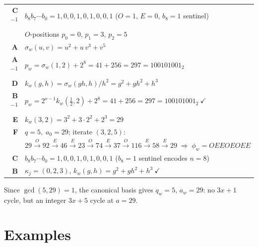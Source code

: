 \documentclass[12pt]{article}
\theoremstyle{definition}
\theoremstyle{remark}
\newcommand{\kpoly}{k}
\begin{document}
\noindent\begin{tabular}{@{}r@{\quad}l@{}}
\textbf{C\textsuperscript{$-1$}} & $b_8 b_7\cdots b_0 = 1,0,0,1,0,1,0,0,1$ \quad ($O{=}1$, $E{=}0$, $b_8{=}1$ sentinel) \\
               & $O$-positions $p_0{=}0,\,p_1{=}3,\,p_2{=}5$ \\[4pt]
\textbf{A}     & $\sigma_w(u,v) = u^2 + u\,v^3 + v^5$ \\
\textbf{A\textsuperscript{$-1$}} & $p_w = \sigma_w(1,2)+2^8 = 41+256 = 297 = 100101001_2$ \\[4pt]
\textbf{D}     & $\kpoly_w(g,h) = \sigma_w(gh,h)/h^2 = g^2+gh^2+h^3$ \\
\textbf{B\textsuperscript{$-1$}} & $p_w = 2^{o-1}\kpoly_w\!\left(\tfrac{1}{2},2\right)+2^8 = 41+256 = 297 = 100101001_2\ \checkmark$ \\[4pt]
\textbf{E}     & $\kpoly_w(3,2) = 3^2+3\cdot 2^2+2^3 = 29$ \\[4pt]
\textbf{F}     & $q=5,\;a_0=29$; iterate $(3,2,5)$: \\
               & $29\xrightarrow{O}92\xrightarrow{E}46\xrightarrow{E}23\xrightarrow{O}
                 74\xrightarrow{E}37\xrightarrow{O}116\xrightarrow{E}58\xrightarrow{E}29
                 \;\Rightarrow\;\phi_w = OEEOEOEE$ \\[4pt]
\textbf{C}     & $b_8 b_7\cdots b_0 = 1,0,0,1,0,1,0,0,1$ \quad($b_8{=}1$ sentinel encodes $n{=}8$) \\
\textbf{B}     & $\kappa_j=(0,2,3)$,\; $\kpoly_w(g,h)=g^2+gh^2+h^3\ \checkmark$
\end{tabular}

\medskip\noindent
Since $\gcd(5,29)=1$, the canonical basis gives $q_w=5$, $a_w=29$:
no $3x{+}1$ cycle, but an integer $3x{+}5$ cycle at $a=29$.

\section{Examples}
\label{sec:examples}
\end{document}
